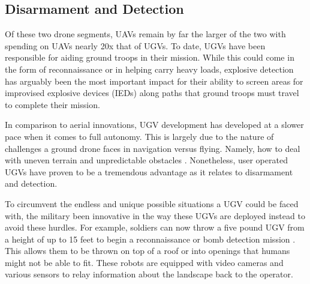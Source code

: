 \documentclass[sigconf]{acmart}
\begin{document}
\subsection{Disarmament and Detection}
Of these two drone segments, UAVs remain by far the larger of the two with spending on UAVs nearly 20x that of UGVs\cite{dronebudget}. To date, UGVs have been responsible for aiding ground troops in their mission. While this could come in the form of reconnaissance or in helping carry heavy loads, explosive detection has arguably been the most important impact for their ability to screen areas for improvised explosive devices (IEDs) along paths that ground troops must travel to complete their mission. 

In comparison to aerial innovations, UGV development has developed at a slower pace when it comes to full autonomy. This is largely due to the nature of challenges a ground drone faces in navigation versus flying. Namely, how to deal with uneven terrain and unpredictable obstacles \cite{nytugv}. Nonetheless, user operated UGVs have proven to be a tremendous advantage as it relates to disarmament and detection.

To circumvent the endless and unique possible situations a UGV could be faced with, the military been innovative in the way these UGVs are deployed instead to avoid these hurdles. For example, soldiers can now throw a five pound UGV from a height of up to 15 feet to begin a reconnaissance or bomb detection mission \cite{throwugv}. This allows them to be thrown on top of a roof or into openings that humans might not be able to fit. These robots are equipped with video cameras and various sensors to relay information about the landscape back to the operator.  
\end{document}
